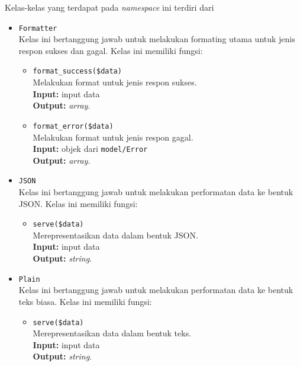     Kelas-kelas yang terdapat pada \textit{namespace} ini terdiri dari
    \begin{itemize}
        \item \texttt{Formatter} \\
            Kelas ini bertanggung jawab untuk melakukan formating utama untuk
            jenis respon sukses dan gagal. Kelas ini memiliki fungsi:
            \begin{itemize}
                \item \texttt{format\_success(\$data)} \\
                    Melakukan format untuk jenis respon sukses.\\
                    \textbf{Input:} input data\\
                    \textbf{Output:} \textit{array}.
                    
                \item \texttt{format\_error(\$data)} \\
                    Melakukan format untuk jenis respon gagal.\\
                    \textbf{Input:} objek dari \texttt{model/Error}\\
                    \textbf{Output:} \textit{array}.
            \end{itemize}
            
        \item \texttt{JSON} \\
            Kelas ini bertanggung jawab untuk melakukan performatan data ke
            bentuk JSON. Kelas ini memiliki fungsi:
            \begin{itemize}
                \item \texttt{serve(\$data)} \\
                    Merepresentasikan data dalam bentuk JSON.\\
                    \textbf{Input:} input data\\
                    \textbf{Output:} \textit{string}.
            \end{itemize}
            
        \item \texttt{Plain} \\
            Kelas ini bertanggung jawab untuk melakukan performatan data ke
            bentuk teks biasa. Kelas ini memiliki fungsi:
            \begin{itemize}
                \item \texttt{serve(\$data)} \\
                    Merepresentasikan data dalam bentuk teks.\\
                    \textbf{Input:} input data\\
                    \textbf{Output:} \textit{string}.
            \end{itemize}
            

\end{itemize}
